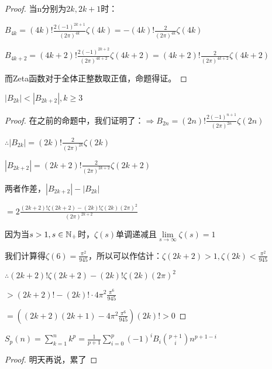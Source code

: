 \documentclass[12pt, a4paper, oneside, UTF8]{ctexbook}
\begin{document}
\begin{para}{0}
\begin{para}{1}
\begin{proof}
							当n分别为$2k,2k+1$时：
							
							$B_{4k} = (4k)!\frac{2(-1)^{2k+1}}{(2\pi)^{4k}}\zeta(4k)=-(4k)!\frac{2}{(2\pi)^{4k}}\zeta(4k)$
							
							$B_{4k+2} = (4k+2)!\frac{2(-1)^{2k+2}}{(2\pi)^{4k+2}}\zeta(4k+2)=(4k+2)!\frac{2}{(2\pi)^{4k+2}}\zeta(4k+2)$
							
							而Zeta函数对于全体正整数取正值，命题得证。
						\end{proof}
						\begin{proposition}
							$|B_{2k}|<|B_{2k+2}|,k \geqslant 3$
						\end{proposition}
						\begin{proof}
							在之前的命题中，我们证明了：$\Rightarrow B_{2n} = (2n)!\frac{2(-1)^{n+1}}{(2\pi)^{2n}}\zeta(2n)$
							
							$\therefore |B_{2k}| = (2k)!\frac{2}{(2\pi)^{2k}}\zeta(2k)$
							
							$|B_{2k+2}| = (2k+2)!\frac{2}{(2\pi)^{2k+2}}\zeta(2k+2)$
							
							两者作差，$|B_{2k+2}|-|B_{2k}|$
							
							$=2\frac{(2k+2)!\zeta(2k+2)-(2k)!\zeta(2k)(2\pi)^2}{(2\pi)^{2k+2}}$
							
							因为当$s>1,s \in \mathbb{N}_+$时，$\zeta(s)$单调递减且$\lim\limits_{s\to\infty}\zeta(s) = 1$
							
							我们计算得$\zeta(6)=\frac{\pi^2}{945}$，所以可以作估计：$\zeta(2k+2)>1,\zeta(2k)<\frac{\pi^2}{945}$
							
							$\therefore (2k+2)!\zeta(2k+2)-(2k)!\zeta(2k)(2\pi)^2$
							
							$> (2k+2)!-(2k)!\cdot 4\pi^2 \frac{\pi^6}{945}$
							
							$=\left((2k+2)(2k+1)- 4\pi^2 \frac{\pi^6}{945}\right)(2k)!>0$
							
						\end{proof}
					\begin{proposition}
						$S_p(n)=\sum\limits_{k=1}^{n}k^p=\frac{1}{p+1}\sum\limits_{i=0}^{p} (-1)^i B_i \binom{p+1}{i} n^{p+1-i}$
					\end{proposition}
					\begin{proof}
						明天再说，累了
					\end{proof}
				\end{para}
			\end{para}
\end{document}
